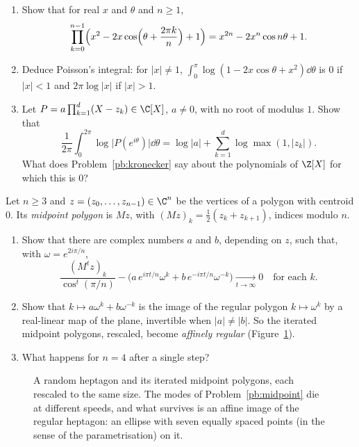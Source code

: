 \begin{exercise}[$\star\star$]\label{pb:jensen}
\begin{enumerate}[label=(\alph*)]
\item Show that for real $x$ and $\theta$ and $n\ge1$,
\[
\prod_{k=0}^{n-1}\Bigl(x^2-2x\cos\Bigl(\theta+\frac{2\pi k}n\Bigr)+1\Bigr)=x^{2n}-2x^n\cos n\theta+1.
\]
\item Deduce Poisson's integral: for $|x|\ne1$, $\int_0^\pi\log(1-2x\cos\theta+x^2)\dd\theta$ is $0$ if $|x|<1$ and
$2\pi\log|x|$ if $|x|>1$.
\item Let $P=a\prod_{k=1}^d(X-z_k)\in\C[X]$, $a\ne0$, with no root of modulus $1$. Show that
\[
\frac1{2\pi}\int_0^{2\pi}\log\bigl|P(e^{i\theta})\bigr|\dd\theta=\log|a|+\sum_{k=1}^d\log\max(1,|z_k|).
\]
What does Problem~\ref{pb:kronecker} say about the polynomials of $\Z[X]$ for which this is $0$?
\end{enumerate}
\end{exercise}

\begin{exercise}[$\star\star$]\label{pb:midpoint}
Let $n\ge3$ and $z=(z_0,\dots,z_{n-1})\in\C^n$ be the vertices of a polygon with centroid $0$. Its \emph{midpoint
polygon} is $Mz$, with $(Mz)_k=\frac12(z_k+z_{k+1})$, indices modulo $n$.
\begin{enumerate}[label=(\alph*)]
\item Show that there are complex numbers $a$ and $b$, depending on $z$, such that, with $\omega=e^{2i\pi/n}$,
\[
\frac{(M^tz)_k}{\cos^t(\pi/n)}-\bigl(a\,e^{i\pi t/n}\omega^k+b\,e^{-i\pi t/n}\omega^{-k}\bigr)\xrightarrow[t\to\infty]{}0
\quad\text{for each }k.
\]
\item Show that $k\mapsto a\omega^k+b\omega^{-k}$ is the image of the regular polygon $k\mapsto\omega^k$ by a real-linear
map of the plane, invertible when $|a|\ne|b|$. So the iterated midpoint polygons, rescaled, become \emph{affinely regular}
(Figure~\ref{fig:midpoint}).
\item What happens for $n=4$ after a single step?
\end{enumerate}
\end{exercise}

\begin{figure}[ht]
\centering
{}
\caption{A random heptagon and its iterated midpoint polygons, each rescaled to the same size. The modes of
Problem~\ref{pb:midpoint} die at different speeds, and what survives is an affine image of the regular heptagon: an ellipse
with seven equally spaced points (in the sense of the parametrisation) on it.}
\label{fig:midpoint}
\end{figure}

